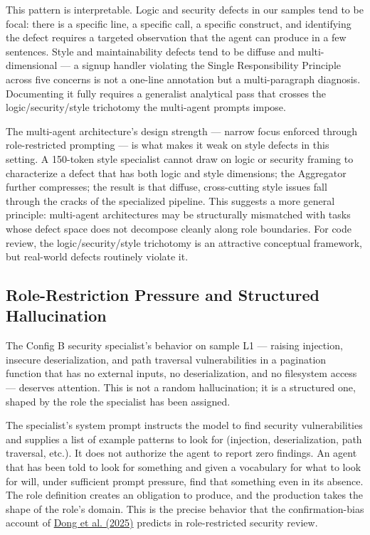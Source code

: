 \documentclass[pdflatex,sn-mathphys-num]{sn-jnl}
\newcommand{\apa}[2]{\hyperlink{cite.#1}{#2}}
\theoremstyle{thmstyleone}
\theoremstyle{thmstyletwo}
\theoremstyle{thmstylethree}
\begin{document}
This pattern is interpretable. Logic and security defects in our samples tend to be focal: there is a specific line, a specific call, a specific construct, and identifying the defect requires a targeted observation that the agent can produce in a few sentences. Style and maintainability defects tend to be diffuse and multi-dimensional --- a signup handler violating the Single Responsibility Principle across five concerns is not a one-line annotation but a multi-paragraph diagnosis. Documenting it fully requires a generalist analytical pass that crosses the logic/security/style trichotomy the multi-agent prompts impose.

The multi-agent architecture's design strength --- narrow focus enforced through role-restricted prompting --- is what makes it weak on style defects in this setting. A 150-token style specialist cannot draw on logic or security framing to characterize a defect that has both logic and style dimensions; the Aggregator further compresses; the result is that diffuse, cross-cutting style issues fall through the cracks of the specialized pipeline. This suggests a more general principle: multi-agent architectures may be structurally mismatched with tasks whose defect space does not decompose cleanly along role boundaries. For code review, the logic/security/style trichotomy is an attractive conceptual framework, but real-world defects routinely violate it.

\subsection{Role-Restriction Pressure and Structured Hallucination}

The Config B security specialist's behavior on sample L1 --- raising injection, insecure deserialization, and path traversal vulnerabilities in a pagination function that has no external inputs, no deserialization, and no filesystem access --- deserves attention. This is not a random hallucination; it is a structured one, shaped by the role the specialist has been assigned.

The specialist's system prompt instructs the model to find security vulnerabilities and supplies a list of example patterns to look for (injection, deserialization, path traversal, etc.). It does not authorize the agent to report zero findings. An agent that has been told to look for something and given a vocabulary for what to look for will, under sufficient prompt pressure, find that something even in its absence. The role definition creates an obligation to produce, and the production takes the shape of the role's domain. This is the precise behavior that the confirmation-bias account of \apa{dong2025}{Dong et al. (2025)} predicts in role-restricted security review.
\end{document}

